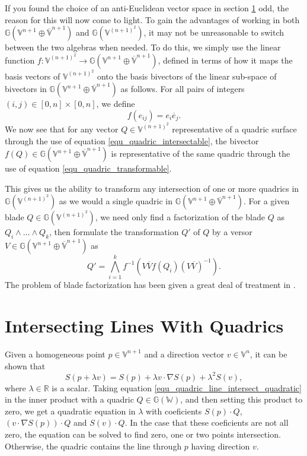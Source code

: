 \documentclass{birkjour}
\theoremstyle{definition}
\theoremstyle{remark}
\numberwithin{equation}{section}
\newcommand{\G}{\mathbb{G}}
\newcommand{\V}{\mathbb{V}}
\newcommand{\Vb}{\mathbb{\overline{V}}}
\newcommand{\W}{\mathbb{W}}
\newcommand{\R}{\mathbb{R}}
\begin{document}

If you found the choice of an anti-Euclidean vector
space in section \ref{} odd, the reason for this will
now come to light.  To gain the advantages of working
in both $\G(\V^{n+1}\oplus\Vb^{n+1})$ and $\G(\V^{(n+1)^2})$,
it may not be unreasonable to switch between the two
algebras when needed.  To do this, we simply use the linear
function $f:\V^{(n+1)^2}\to\G(\V^{n+1}\oplus\Vb^{n+1})$,
defined in terms of how it maps the basis vectors of $\V^{(n+1)^2}$ onto the
basis bivectors of the linear sub-space of bivectors in $\G(\V^{n+1}\oplus\Vb^{n+1})$ as follows.
For all pairs of integers $(i,j)\in[0,n]\times[0,n]$, we define
\begin{equation}
f(e_{ij})=e_i\overline{e}_j.
\end{equation}
We now see that for any vector $Q\in\V^{(n+1)^2}$ representative of
a quadric surface through the use of equation \eqref{equ_quadric_intersectable}, the bivector
$f(Q)\in\G(\V^{n+1}\oplus\Vb^{n+1})$ is representative of the same
quadric through the use of equation \eqref{equ_quadric_transformable}.

This gives us the ability to transform any intersection of one or more quadrics
in $\G(\V^{(n+1)^2})$ as we would a single quadric in $\G(\V^{n+1}\oplus\Vb^{n+1})$.
For a given blade $Q\in\G(\V^{(n+1)^2})$, we need only find a factorization
of the blade $Q$ as $Q_i\wedge\dots\wedge Q_k$, then formulate the transformation $Q'$
of $Q$ by a versor $V\in\G(\V^{n+1}\oplus\Vb^{n+1})$ as
\begin{equation}
Q' = \bigwedge_{i=1}^k f^{-1}\left(V\overline{V}f(Q_i)(V\overline{V})^{-1}\right).
\end{equation}
The problem of blade factorization has been given a great deal of treatment in \cite{}.

\section{Intersecting Lines With Quadrics}

Given a homogeneous point $p\in\V^{n+1}$ and a direction vector $v\in\V^n$,
it can be shown that
\begin{equation}\label{equ_quadric_line_intersect_quadratic}
S(p+\lambda v) = S(p)+\lambda v\cdot\nabla S(p)+\lambda^2 S(v),
\end{equation}
where $\lambda\in\R$ is a scalar.  Taking equation \eqref{equ_quadric_line_intersect_quadratic} in the
inner product with a quadric $Q\in\G(\W)$, and then setting this
product to zero, we get a quadratic equation in $\lambda$ with
coeficients $S(p)\cdot Q$, $(v\cdot\nabla S(p))\cdot Q$ and $S(v)\cdot Q$.
In the case that these coeficients are not all zero, the equation can be
solved to find zero, one or two points intersection.  Otherwise, the quadric
contains the line through $p$ having direction $v$.
\end{document}
